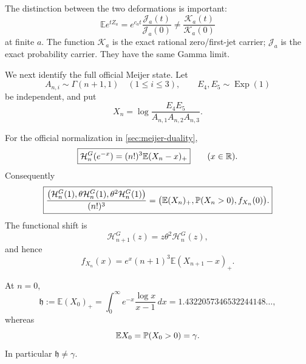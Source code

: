 The distinction between the two deformations is important:
\begin{equation}\label{eq:mgf-not-K}
 \mathbb Ee^{tZ_a}
 =e^{c_at}\frac{\mathscr J_a(t)}{\mathscr J_a(0)}
 \ne\frac{\mathscr K_a(t)}{\mathscr K_a(0)}
\end{equation}
at finite \(a\).  The function \(\mathscr K_a\) is the exact rational
zero/first-jet carrier; \(\mathscr J_a\) is the exact probability carrier.
They have the same Gamma limit.

We next identify the full official Meijer state.  Let
\begin{equation}\label{eq:Xn-def}
 A_{n,i}\sim\Gamma(n+1,1)\quad(1\le i\le3),\qquad
 E_4,E_5\sim\operatorname{Exp}(1)
\end{equation}
be independent, and put
\begin{equation}\label{eq:Xn-ratio}
 X_n=\log\frac{E_4E_5}{A_{n,1}A_{n,2}A_{n,3}}.
\end{equation}

\begin{theorem}
\label{thm:meijer-probability}
For the official normalization in \cref{sec:meijer-duality},
\begin{equation}\label{eq:Meijer-stop-loss}
 \boxed{\displaystyle
 \mathcal H_n^G(e^{-x})=(n!)^3\mathbb E(X_n-x)_+}
 \qquad(x\in\mathbb R).
\end{equation}
Consequently
\begin{equation}\label{eq:Meijer-state-probability}
 \boxed{\displaystyle
 \frac{\bigl(\mathcal H_n^G(1),\theta\mathcal H_n^G(1),
 \theta^2\mathcal H_n^G(1)\bigr)}{(n!)^3}
 =\bigl(\mathbb E(X_n)_+,\mathbb P(X_n>0),f_{X_n}(0)\bigr).}
\end{equation}
The functional shift is
\begin{equation}\label{eq:Meijer-functional-shift}
 \mathcal H_{n+1}^G(z)=z\theta^2\mathcal H_n^G(z),
\end{equation}
and hence
\begin{equation}\label{eq:probability-conservation}
 f_{X_n}(x)=e^x(n+1)^3\mathbb E(X_{n+1}-x)_+.
\end{equation}

At \(n=0\),
\begin{equation}\label{eq:h-constant}
 \mathfrak h:=\mathbb E(X_0)_+
 =\int_0^\infty e^{-x}\frac{\log x}{x-1}\,dx
 =1.4322057346532244148\ldots,
\end{equation}
whereas
\begin{equation}\label{eq:Powers-gamma}
 \mathbb EX_0=\mathbb P(X_0>0)=\gamma.
\end{equation}
In particular \(\mathfrak h\ne\gamma\).
\end{theorem}

